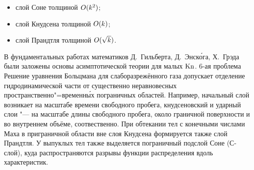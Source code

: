 

\begin{itemize}
    \item слой Соне толщиной \(O(k^2)\);
    \item слой Кнудсена толщиной \(O(k)\);
    \item слой Прандтля толщиной \(O(\sqrt{k})\).
\end{itemize}


В фундаментальных работах математиков Д.~Гильберта, Д.~Энск\'{о}га, Х.~Грэда
были заложены основы асимптотической теории для малых \(\mathrm{Kn}\).
6-ая проблема
Решение уравнения Больцмана для слаборазрежённого газа допускает отделение гидродинамической части
от существенно неравновесных пространственно"=временн\'{ы}х пограничных областей.
Например, начальный слой возникает на масштабе времени свободного пробега,
кнудсеновский и ударный слои "--- на масштабе длины свободного пробега,
около граничной поверхности и во внутреннем объёме, соотвественно.
При обтекании тел с конечными числами Маха в приграничной области вне слоя Кнудсена
формируется также слой Прандтля. У выпуклых тел также выделяется пограничный подслой Соне (С-слой),
куда распространяются разрывы функции распределения вдоль характеристик.



